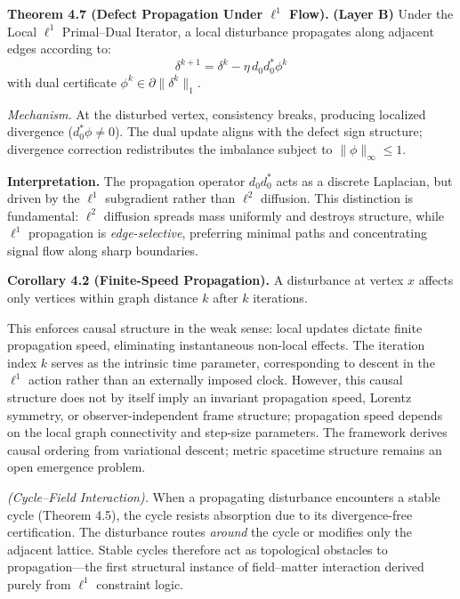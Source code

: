 \documentclass[
]{article}
\begin{document}
\textbf{Theorem 4.7 (Defect Propagation Under \(\ell^1\) Flow).}
\textbf{(Layer B)} Under the Local \(\ell^1\) Primal--Dual Iterator, a
local disturbance propagates along adjacent edges according to:
\[ \delta^{k+1} = \delta^k - \eta \, d_0 d_0^* \phi^k \] with dual
certificate \(\phi^k \in \partial \|\delta^k\|_1\).

\emph{Mechanism.} At the disturbed vertex, consistency breaks, producing
localized divergence (\(d_0^* \phi \neq 0\)). The dual update aligns
with the defect sign structure; divergence correction redistributes the
imbalance subject to \(\|\phi\|_\infty \le 1\).

\textbf{Interpretation.} The propagation operator \(d_0 d_0^*\) acts as
a discrete Laplacian, but driven by the \(\ell^1\) subgradient rather
than \(\ell^2\) diffusion. This distinction is fundamental: \(\ell^2\)
diffusion spreads mass uniformly and destroys structure, while
\(\ell^1\) propagation is \emph{edge-selective}, preferring minimal
paths and concentrating signal flow along sharp boundaries.

\textbf{Corollary 4.2 (Finite-Speed Propagation).} A disturbance at
vertex \(x\) affects only vertices within graph distance \(k\) after
\(k\) iterations.

This enforces causal structure in the weak sense: local updates dictate
finite propagation speed, eliminating instantaneous non-local effects.
The iteration index \(k\) serves as the intrinsic time parameter,
corresponding to descent in the \(\ell^1\) action rather than an
externally imposed clock. However, this causal structure does not by
itself imply an invariant propagation speed, Lorentz symmetry, or
observer-independent frame structure; propagation speed depends on the
local graph connectivity and step-size parameters. The framework derives
causal ordering from variational descent; metric spacetime structure
remains an open emergence problem.

\emph{(Cycle--Field Interaction).} When a propagating disturbance
encounters a stable cycle (Theorem 4.5), the cycle resists absorption
due to its divergence-free certification. The disturbance routes
\emph{around} the cycle or modifies only the adjacent lattice. Stable
cycles therefore act as topological obstacles to propagation---the first
structural instance of field--matter interaction derived purely from
\(\ell^1\) constraint logic.
\end{document}
